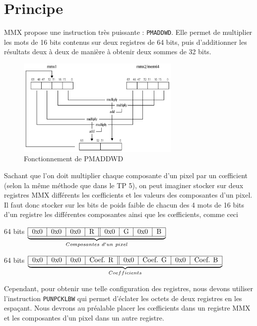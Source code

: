 \section{Principe}
MMX propose une instruction très puissante : \lstinline{PMADDWD}. Elle permet de multiplier les mots de 16 bits contenus sur deux registres de 64 bits, puis d'additionner les résultats deux à deux de manière à obtenir deux sommes de 32 bits.
\begin{figure}[!h]
   \centering\includegraphics[width=0.7\textwidth]{illustrations/pmaddwd.png}
   \caption{Fonctionnement de PMADDWD}
\end{figure}

Sachant que l'on doit multiplier chaque composante d'un pixel par un c\oe{}fficient (selon la même méthode que dans le TP 5), on peut imaginer stocker sur deux registres MMX différents les c\oe{}fficients et les valeurs des composantes d'un pixel. Il faut donc stocker sur les bits de poids faible de chacun des 4 mots de 16 bits d'un registre les différentes composantes ainsi que les c\oe{}fficients, comme ceci

\begin{center}
64 bits $\underbrace{
    \begin{tabular}{|c|c|c|c||c|c|c|c|}
    \hline
    0x0 & 0x0 & 0x0 & R & 0x0 & G & 0x0 & B \\
    \hline
    \end{tabular}}_{Composantes\ d'un\ pixel}$
\end{center}
\begin{center}
64 bits $\underbrace{
    \begin{tabular}{|c|c|c|c||c|c|c|c|}
    \hline
    0x0 & 0x0 & 0x0 & Coef. R & 0x0 & Coef. G & 0x0 & Coef. B \\
    \hline
    \end{tabular}}_{Coefficients}$
\end{center}

Cependant, pour obtenir une telle \og configuration\fg{} des registres, nous devons utiliser l'instruction \lstinline{PUNPCKLBW} qui permet \og d'éclater\fg{} les octets de deux registres en les espaçant. Nous devrons au préalable placer les c\oe{}fficients dans un registre MMX et les composantes d'un pixel dans un autre registre.

